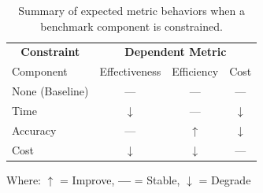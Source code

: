     
    \begin{table}[t]
        \begin{center}
        {\footnotesize
        \begin{tabular}{l|ccc} 
            \multicolumn{1}{c}{\textbf{Constraint}}                    & \multicolumn{3}{c}{\textbf{Dependent Metric}}           \\%
               Component              & Effectiveness       & Efficiency      &  Cost         \\%
            \hline
                None (Baseline)         &  ---                &  ---            &  ---             \\%
                Time                    & $\downarrow$        &  ---            & $\downarrow$  \\%
                Accuracy                & ---                 & $\uparrow$      & $\downarrow$  \\%
                Cost                    & $\downarrow$        & $\downarrow$    &  ---          \\%

        \end{tabular}
        \caption{Summary of expected metric behaviors when a benchmark component is constrained.} 
        \label{Table:gai-variance}
        }
        \end{center}
        {
            \noindent
            \footnotesize
            Where: 
            \textbf{$\uparrow$} = Improve,
            \textbf{---} = Stable, 
            \textbf{$\downarrow$} = Degrade
            }
    \end{table}

